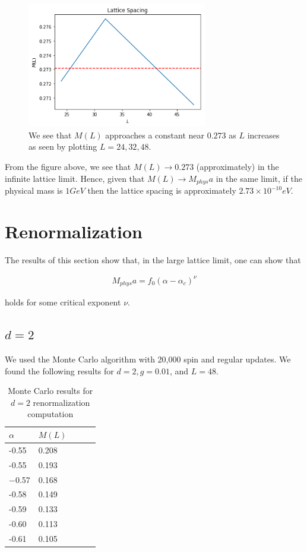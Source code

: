 \documentclass[12]{report}
\newcommand\0{\mathbf{0}}
\newcommand\<{\langle}
\renewcommand\>{\rangle}
\begin{document}
\begin{figure}[H]
\centering
\includegraphics[width=0.7\textwidth]{lattice_spacing.png}
\caption{We see that $M(L)$ approaches a constant near $0.273$ as $L$ increases as seen by plotting $L = 24, 32, 48$.}	
\end{figure}

From the figure above, we see that $M(L) \rightarrow 0.273$ (approximately) in the infinite lattice limit. Hence, given that $M(L) \rightarrow M_{phys}a$ in the same limit, if the physical mass is $1 GeV$ then the lattice spacing is approximately $2.73 \times 10^{-10} eV$. 

\section{Renormalization}

The results of this section show that, in the large lattice limit, one can show that

\begin{align}
\label{eq:renorm}
M_{phys}a = f_0 (\alpha - \alpha_c)^\nu 
\end{align}

holds for some critical exponent $\nu$.

\subsection{$d=2$}

We used the Monte Carlo algorithm with 20,000 spin and regular updates. We found the following results for $d=2, g = 0.01$, and $L = 48$.

\begin{table}[H]
\centering
\begin{tabular}{|l|l|l|l|l|}
\hline
$\alpha$ & $M(L)$ \\ \hline
-0.55   & 0.208 \\
-0.55 & 0.193 \\
−0.57   & 0.168 \\ 
-0.58 & 0.149\\
-0.59 & 0.133 \\
-0.60 & 0.113 \\
-0.61 & 0.105 \\\hline
\end{tabular}
\caption{Monte Carlo results for $d=2$ renormalization computation}
\end{table}
\end{document}

